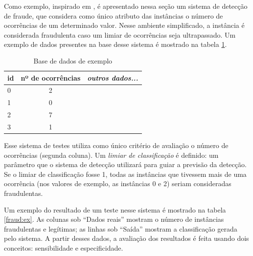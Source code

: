 Como exemplo, inspirado em \citet{Bewick2004}, é apresentado nessa seção um sistema de detecção de fraude, que considera como único atributo das instâncias o número de ocorrências de um determinado valor. Nesse ambiente simplificado, a instância é considerada fraudulenta caso um limiar de ocorrências seja ultrapassado. Um exemplo de dados presentes na base desse sistema é mostrado na tabela \ref{fraud:ex_data}.

\renewcommand{\arraystretch}{1.5}
\vspace{2mm}
\begin{table}[h!]
    \centering
    \begin{tabular}{l|c|l}
        id & nº de ocorrências & \emph{outros dados...} \\
        \hline
        0 & 2           & \\
        1 & 0           & \\
        2 & 7           & \\
        3 & 1           & \\
    \end{tabular}
    \caption{Base de dados de exemplo}
    \label{fraud:ex_data}
\end{table}
\vspace{2mm}

Esse sistema de testes utiliza como único critério de avaliação o número de ocorrências (segunda coluna). Um \emph{limiar de classificação} é definido: um parâmetro que o sistema de detecção utilizará para guiar a previsão da detecção. Se o limiar de classificação fosse 1, todas as instâncias que tivessem mais de uma ocorrência (nos valores de exemplo, as instâncias 0 e 2) seriam consideradas fraudulentas.

Um exemplo do resultado de um teste nesse sistema é mostrado na tabela \ref{fraud:ex}. As colunas sob ``Dados reais'' mostram o número de instâncias fraudulentas e legítimas; as linhas sob ``Saída'' mostram a classificação gerada pelo sistema. A partir desses dados, a avaliação dos resultados é feita usando dois conceitos: sensibilidade e especificidade.

